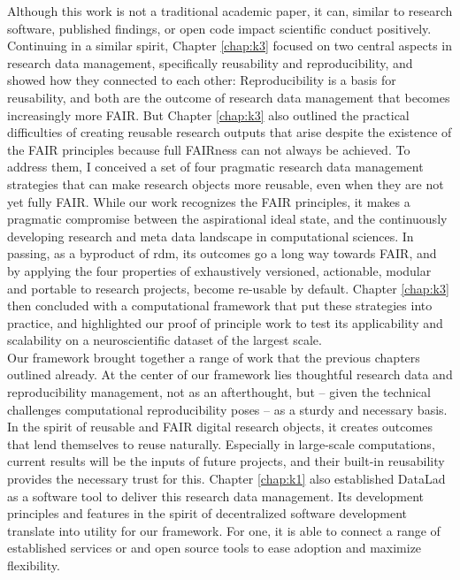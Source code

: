 Although this work is not a traditional academic paper, it can, similar to research software, published findings, or open code impact scientific conduct positively.\\
Continuing in a similar spirit, Chapter \ref{chap:k3} focused on two central aspects in research data management, specifically reusability and reproducibility, and showed how they connected to each other:
Reproducibility is a basis for reusability, and both are the outcome of research data management that becomes increasingly more FAIR.
But Chapter \ref{chap:k3} also outlined the practical difficulties of creating reusable research outputs that arise despite the existence of the \gls{FAIR} principles because full FAIRness can not always be achieved.
To address them, I conceived a set of four pragmatic research data management strategies that can make research objects more reusable, even when they are not yet fully \gls{FAIR}.
While our work recognizes the FAIR principles, it makes a pragmatic compromise between the aspirational ideal state, and the continuously developing research and meta data landscape in computational sciences.
In passing, as a byproduct of \gls{rdm}, its outcomes go a long way towards FAIR, and by applying the four properties of exhaustively versioned, actionable, modular and portable to research projects, become re-usable by default.
Chapter \ref{chap:k3} then concluded with a computational framework that put these strategies into practice, and highlighted our proof of principle work to test its applicability and scalability on a neuroscientific dataset of the largest scale.\\
Our framework brought together a range of work that the previous chapters outlined already.
At the center of our framework lies thoughtful research data and reproducibility management, not as an afterthought, but -- given the technical challenges computational reproducibility poses -- as a sturdy and necessary basis.
In the spirit of reusable and FAIR digital research objects, it creates outcomes that lend themselves to reuse naturally.
Especially in large-scale computations, current results will be the inputs of future projects, and their built-in reusability provides the necessary trust for this.
Chapter \ref{chap:k1} also established DataLad as a software tool to deliver this research data management.
Its development principles and features in the spirit of decentralized software development translate into utility for our framework.
For one, it is able to connect a range of established services or and open source tools to ease adoption and maximize flexibility.

